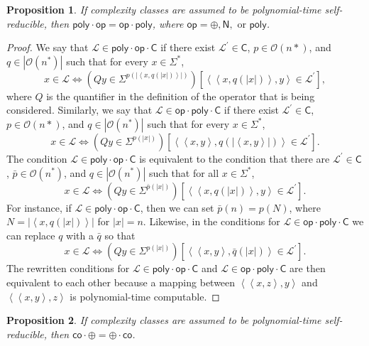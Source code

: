 \documentclass[12pt]{amsart}
\newtheorem*{proposition}{Proposition}
\theoremstyle{definition}
\theoremstyle{remark}
\newcommand{\cL}{\mathcal{L}}
\newcommand{\sC}{\mathsf{C}}
\newcommand{\co}{\mathsf{co}}
\newcommand{\poly}{\mathsf{poly}}
\newcommand{\msf}[1]{\mathsf{#1}}
\newcommand{\Oh}{\mathcal{O}}
\newcommand{\inner}[1]{\left\langle#1\right\rangle}
\newcommand{\op}{\msf{op}}
\newcommand{\sN}{\msf{N}}
\begin{document}
\begin{proposition}
If complexity classes are assumed to be polynomial-time self-reducible, then
$\poly\cdot\op=\op\cdot\poly$, where $\op=\oplus,\sN,\text{ or }\poly$.
\end{proposition}

\begin{proof}
We say that $\cL\in\poly\cdot\op\cdot\sC$ if there exist $\cL^\prime\in\sC$,
$p\in\Oh(n*)$, and $q\in|\Oh(n^*)|$ such that for every $x\in\Sigma^*$,
\[
x\in\cL\Longleftrightarrow
(Qy\in\Sigma^{p(|\inner{x,q(|x|)}|)})[\inner{\inner{x,q(|x|)},y}\in\cL^\prime],
\]
where $Q$ is the quantifier in the definition of the operator that is being
considered. Similarly, we say that $\cL\in\op\cdot\poly\cdot\sC$ if there exist
$\cL^\prime\in\sC$, $p\in\Oh(n*)$, and $q\in|\Oh(n^*)|$ such that for every
$x\in\Sigma^*$,
\[
x\in\cL\Longleftrightarrow
(Qy\in\Sigma^{p(|x|)})[\inner{\inner{x,y},q(|\inner{x,y}|)}\in\cL^\prime].
\]
The condition $\cL\in\poly\cdot\op\cdot\sC$ is equivalent to the condition that
there are $\cL^\prime\in\sC$, $\bar p\in\Oh(n^*)$, and $q\in|\Oh(n^*)|$ such
that for all $x\in\Sigma^*$,
\[
x\in\cL\Longleftrightarrow
(Qy\in\Sigma^{\bar p(|x|)})[\inner{\inner{x,q(|x|)},y}\in\cL^\prime].
\]
For instance, if $\cL\in\poly\cdot\op\cdot\sC$, then we can set $\bar
p(n)=p(N)$, where $N=|\inner{x,q(|x|)}|$ for $|x|=n$. Likewise, in the
conditions for $\cL\in\op\cdot\poly\cdot\sC$ we can replace $q$ with a $\bar q$
so that
\[
x\in\cL\Longleftrightarrow
(Qy\in\Sigma^{p(|x|)})[\inner{\inner{x,y},\bar q(|x|)}\in\cL^\prime].
\]
The rewritten conditions for $\cL\in\poly\cdot\op\cdot\sC$ and
$\cL\in\op\cdot\poly\cdot\sC$ are then equivalent to each other because a
mapping between $\inner{\inner{x,z},y}$ and $\inner{\inner{x,y},z}$ is
polynomial-time computable.
\end{proof}

\begin{proposition}
If complexity classes are assumed to be polynomial-time self-reducible, then
$\co\cdot\oplus=\oplus\cdot\co$.
\end{proposition}
\end{document}
